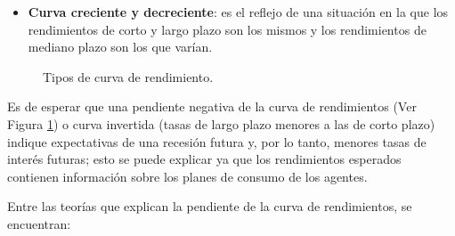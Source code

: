\begin{itemize}
  \item \textbf{Curva creciente y decreciente}: es el reflejo de una situaci\'on en la    que los rendimientos de corto y largo plazo son los mismos y los rendimientos  de mediano plazo son los que var\'ian.
\end{itemize}

\begin{figure}[h]
\caption{Tipos de curva de rendimiento.}
\label{tipos_c}
\end{figure}

\hspace*{0.4 cm} Es de esperar que una pendiente negativa de la curva de rendimientos (Ver Figura \ref{tipos_c}) o curva invertida (tasas de largo plazo menores a las de corto plazo) indique expectativas de una recesi\'on futura y, por lo tanto, menores tasas de inter\'es futuras; esto se puede explicar ya que los rendimientos esperados contienen informaci\'on sobre los planes de consumo de los agentes. 

\hspace*{0.4 cm} Entre las teor\'ias que explican la pendiente de la curva de rendimientos, se encuentran:

